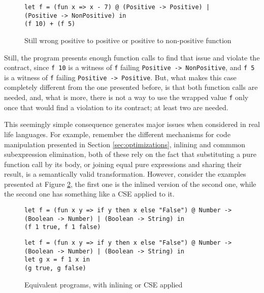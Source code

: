 \documentclass[sigplan,10pt,review,anonymous]{acmart}
\newcommand{\nickel}[1]{\lstinline[language=nickel]{#1}}
\begin{document}
\begin{figure}[h]
\begin{lstlisting}[language=nickel]
let f = (fun x => x - 7) @ (Positive -> Positive) | (Positive -> NonPositive) in
(f 10) + (f 5) 
\end{lstlisting}
\caption{Still wrong positive to positive or positive to non-positive function}
\label{fig:wrong-union-function}
\end{figure}

Still, the program presents enough function calls to find that issue
and violate the contract,
since \nickel{f 10} is a witness of \nickel{f} failing \nickel{Positive -> NonPositive},
and \nickel{f 5} is a witness of \nickel{f} failing \nickel{Positive -> Positive}.
But, what makes this case completely different from the one presented before, is that
both function calls are needed, and, what is more, there is not a way to
use the wrapped value \nickel{f} only once that would find a violation to its contract;
at least two are needed.

This seemingly simple consequence generates major issues when considered in real
life languages.
For example, remember the different mechanisms for code manipulation presented
in Section \ref{sec:optimizations}, inlining and commmon subexpression elimination,
both of these rely on the fact that substituting a pure function call by its body,
or joining equal pure expressions and sharing their result, is a semantically valid
transformation.
However, consider the examples presented at Figure \ref{fig:optimized-programs},
the first one is the inlined version of the second one, while the second
one has something like a CSE applied to it.

\begin{figure}[h]
\begin{lstlisting}[language=nickel, title=Inlined]
let f = (fun x y => if y then x else "False") @ Number -> (Boolean -> Number) | (Boolean -> String) in
(f 1 true, f 1 false)
\end{lstlisting}
\begin{lstlisting}[language=nickel, title=Common Subexpression Eliminated]
let f = (fun x y => if y then x else "False") @ Number -> (Boolean -> Number) | (Boolean -> String) in
let g x = f 1 x in
(g true, g false)
\end{lstlisting}
\caption{Equivalent programs, with inlining or CSE applied}
\label{fig:optimized-programs}
\end{figure}
\end{document}
